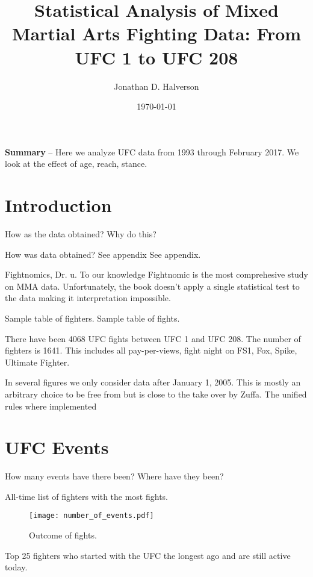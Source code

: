 \documentclass[12pt]{article}
\title{\Huge Statistical Analysis of Mixed Martial Arts Fighting Data: From UFC 1 to UFC 208}
\date{\Large \today}
\author{\Large Jonathan D. Halverson}
\begin{document}
\maketitle
\noindent
\textbf{Summary} -- Here we analyze UFC data from 1993 through February 2017. We look at the effect
of age, reach, stance.

\section*{Introduction}

How as the data obtained? Why do this?

How was data obtained? See appendix See appendix.

Fightnomics, Dr. u.
To our knowledge Fightnomic is the most comprehesive study on MMA
data. Unfortunately, the book doesn't apply a single statistical test
to the data making it interpretation impossible.

Sample table of fighters.
Sample table of fights.

There have been 4068 UFC fights between UFC 1 and UFC 208. The number of fighters is 1641.
This includes all pay-per-views, fight night on FS1, Fox, Spike, Ultimate Fighter.

In several figures we only consider data after January 1, 2005. This is mostly
an arbitrary choice to be free from but is close to the take over by Zuffa. The unified rules where implemented

\section*{UFC Events}

How many events have there been? Where have they been?

\begin{center}
\begin{table}[h]

\caption{All-time list of fighters with the most fights.}
\end{table}
\end{center}


\begin{figure}[h]
\begin{center}
\texttt{[image: number\_of\_events.pdf]}
\caption{Outcome of fights.}
\end{center}
\end{figure}

\begin{center}
\begin{table}[h]

\caption{Top 25 fighters who started with the UFC the longest ago and are still active today.}
\end{table}
\end{center}
\end{document}
